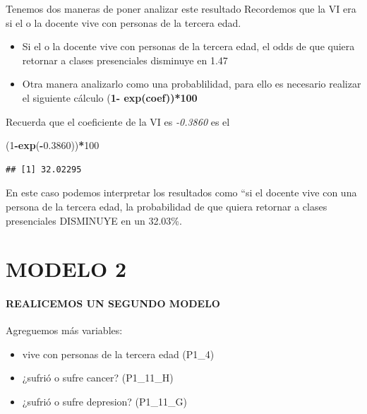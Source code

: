 \documentclass[
]{article}
\newenvironment{Shaded}{\begin{snugshade}}{\end{snugshade}}
\newcommand{\DecValTok}[1]{\textcolor[rgb]{0.00,0.00,0.81}{#1}}
\newcommand{\FloatTok}[1]{\textcolor[rgb]{0.00,0.00,0.81}{#1}}
\newcommand{\FunctionTok}[1]{\textcolor[rgb]{0.13,0.29,0.53}{\textbf{#1}}}
\newcommand{\NormalTok}[1]{#1}
\newcommand{\SpecialCharTok}[1]{\textcolor[rgb]{0.81,0.36,0.00}{\textbf{#1}}}
\begin{document}
Tenemos dos maneras de poner analizar este resultado Recordemos que la
VI era si el o la docente vive con personas de la tercera edad.

\begin{itemize}
\item
  Si el o la docente vive con personas de la tercera edad, el odds de
  que quiera retornar a clases presenciales disminuye en 1.47
\item
  Otra manera analizarlo como una probablilidad, para ello es necesario
  realizar el siguiente cálculo (\textbf{1- exp(coef))*100}
\end{itemize}

Recuerda que el coeficiente de la VI es \emph{-0.3860} es el

\begin{Shaded}
\begin{Highlighting}[]
\NormalTok{(}\DecValTok{1}\SpecialCharTok{{-}}\FunctionTok{exp}\NormalTok{(}\SpecialCharTok{{-}}\FloatTok{0.3860}\NormalTok{))}\SpecialCharTok{*}\DecValTok{100}
\end{Highlighting}
\end{Shaded}

\begin{verbatim}
## [1] 32.02295
\end{verbatim}

En este caso podemos interpretar los resultados como ``si el docente
vive con una persona de la tercera edad, la probabilidad de que quiera
retornar a clases presenciales DISMINUYE en un 32.03\%.

\hypertarget{modelo-2}{%
\section{MODELO 2}\label{modelo-2}}

\hypertarget{realicemos-un-segundo-modelo}{%
\paragraph{REALICEMOS UN SEGUNDO
MODELO}\label{realicemos-un-segundo-modelo}}

Agreguemos más variables:

\begin{itemize}
\item
  vive con personas de la tercera edad (P1\_4)
\item
  ¿sufrió o sufre cancer? (P1\_11\_H)
\item
  ¿sufrió o sufre depresion? (P1\_11\_G)
\end{itemize}
\end{document}
